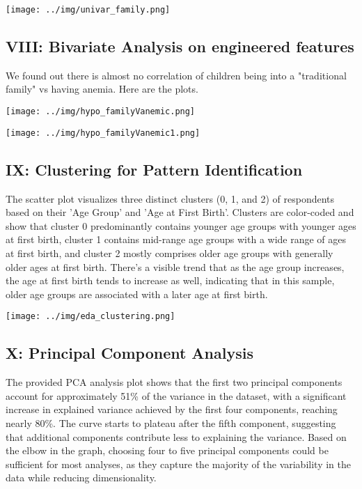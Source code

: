 \texttt{[image: ../img/univar\_family.png]}


\newpage


\subsection{VIII: Bivariate Analysis on engineered features}

We found out there is almost no correlation of children being into a "traditional family" vs having anemia. Here are the plots.

\texttt{[image: ../img/hypo\_familyVanemic.png]}

\texttt{[image: ../img/hypo\_familyVanemic1.png]}


\subsection{IX: Clustering for Pattern Identification }

The scatter plot visualizes three distinct clusters (0, 1, and 2) of respondents based on their 'Age Group' and 'Age at First Birth'. Clusters are color-coded and show that cluster 0 predominantly contains younger age groups with younger ages at first birth, cluster 1 contains mid-range age groups with a wide range of ages at first birth, and cluster 2 mostly comprises older age groups with generally older ages at first birth. There's a visible trend that as the age group increases, the age at first birth tends to increase as well, indicating that in this sample, older age groups are associated with a later age at first birth.

\texttt{[image: ../img/eda\_clustering.png]}


\subsection{X: Principal Component Analysis}


The provided PCA analysis plot shows that the first two principal components account for approximately 51\% of the variance in the dataset, with a significant increase in explained variance achieved by the first four components, reaching nearly 80\%. The curve starts to plateau after the fifth component, suggesting that additional components contribute less to explaining the variance. Based on the elbow in the graph, choosing four to five principal components could be sufficient for most analyses, as they capture the majority of the variability in the data while reducing dimensionality.

